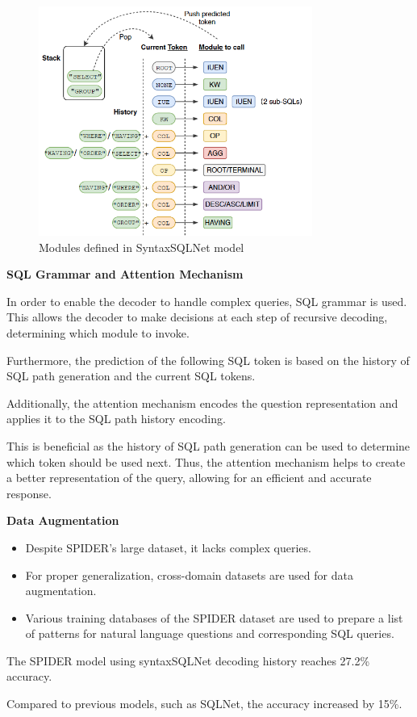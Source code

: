 \begin{figure}[htb]
    \centering
    \includegraphics[width=0.8\textwidth]{pics/SyntaxSQLNet/Grammar.png}
    \caption{Modules defined in SyntaxSQLNet model}
    \label{fig:grammar}
\end{figure}


\textbf{SQL Grammar and Attention Mechanism}

In order to enable the decoder to handle complex queries, SQL grammar is used. This allows the decoder to make decisions at each step of recursive decoding, determining which module to invoke.

Furthermore, the prediction of the following SQL token is based on the history of SQL path generation and the current SQL tokens.

Additionally, the attention mechanism encodes the question representation and applies it to the SQL path history encoding.

This is beneficial as the history of SQL path generation can be used to determine which token should be used next. Thus, the attention mechanism helps to create a better representation of the query, allowing for an efficient and accurate response.



\textbf{Data Augmentation}

\begin{itemize}
    \item Despite SPIDER's large dataset, it lacks complex queries.
    \item For proper generalization, cross-domain datasets are used for data augmentation.
    \item Various training databases of the SPIDER dataset are used to prepare a list of patterns for natural language questions and corresponding SQL queries.
\end{itemize}

The SPIDER model using syntaxSQLNet decoding history reaches 27.2\% accuracy.


Compared to previous models, such as SQLNet, the accuracy increased by 15\%.